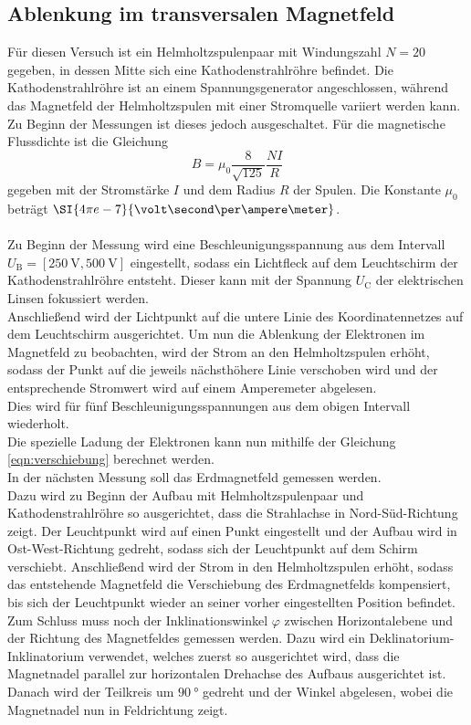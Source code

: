 \subsection{Ablenkung im transversalen Magnetfeld}

    Für diesen Versuch ist ein Helmholtzspulenpaar mit Windungszahl $N = 20$ gegeben,
    in dessen Mitte sich eine Kathodenstrahlröhre befindet.
    Die Kathodenstrahlröhre ist an einem Spannungsgenerator angeschlossen,
    während das Magnetfeld der Helmholtzspulen mit einer Stromquelle
    variiert werden kann.
    Zu Beginn der Messungen ist dieses jedoch ausgeschaltet.
    Für die magnetische Flussdichte ist die Gleichung
    \begin{equation}
        B = \mu_0 \frac{8}{\sqrt{125}}\frac{NI}{R}
        \label{eqn:magn_flussdichte}
    \end{equation}
    gegeben mit der Stromstärke $I$ und dem Radius $R$ der Spulen.
    Die Konstante $\mu_0$ beträgt $\SI{4\pi e-7}{\volt \second \per \ampere \meter}$.\\
    \\
    Zu Beginn der Messung wird eine Beschleunigungsspannung aus dem Intervall $U_\text{B} = [\SI{250}{\volt}, \SI{500}{\volt}]$ eingestellt,
    sodass ein Lichtfleck auf dem Leuchtschirm der Kathodenstrahlröhre entsteht.
    Dieser kann mit der Spannung $U_\text{C}$ der elektrischen Linsen fokussiert werden.\\
    Anschließend wird der Lichtpunkt auf die untere Linie des Koordinatennetzes auf dem Leuchtschirm ausgerichtet.
    Um nun die Ablenkung der Elektronen im Magnetfeld zu beobachten,
    wird der Strom an den Helmholtzspulen erhöht,
    sodass der Punkt auf die jeweils nächsthöhere Linie verschoben wird und der entsprechende Stromwert wird auf einem Amperemeter abgelesen.\\
    Dies wird für fünf Beschleunigungsspannungen aus dem obigen Intervall wiederholt.\\
    Die spezielle Ladung der Elektronen kann nun mithilfe der Gleichung \ref{eqn:verschiebung} berechnet werden.
    \\
    In der nächsten Messung soll das Erdmagnetfeld gemessen werden.\\
    Dazu wird zu Beginn der Aufbau mit Helmholtzspulenpaar und Kathodenstrahlröhre so ausgerichtet,
    dass die Strahlachse in Nord-Süd-Richtung zeigt.
    Der Leuchtpunkt wird auf einen Punkt eingestellt und der Aufbau wird in Ost-West-Richtung gedreht,
    sodass sich der Leuchtpunkt auf dem Schirm verschiebt.
    Anschließend wird der Strom in den Helmholtzspulen erhöht,
    sodass das entstehende Magnetfeld die Verschiebung des Erdmagnetfelds kompensiert,
    bis sich der Leuchtpunkt wieder an seiner vorher eingestellten Position befindet.\\
    Zum Schluss muss noch der Inklinationswinkel $\varphi$ zwischen Horizontalebene und der Richtung des Magnetfeldes gemessen werden.
    Dazu wird ein Deklinatorium-Inklinatorium verwendet,
    welches zuerst so ausgerichtet wird,
    dass die Magnetnadel parallel zur horizontalen Drehachse des Aufbaus ausgerichtet ist.
    Danach wird der Teilkreis um $\SI{90}{\degree}$ gedreht und der Winkel abgelesen,
    wobei die Magnetnadel nun in Feldrichtung zeigt.